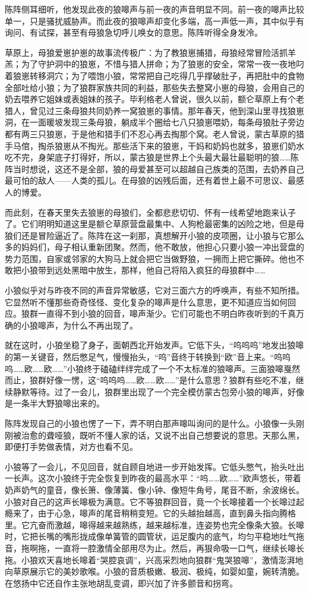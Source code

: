 \par 陈阵侧耳细听，他发现此夜的狼嗥声与前一夜的声音明显不同。前一夜的嗥声比较单一，只是骚扰威胁声。而此夜的狼嗥声却变化多端，高一声低一声，其中似乎有询问、有试探，甚至有母狼急切呼儿唤女的意思。陈阵听得全身发冷。
\par 草原上，母狼爱崽护崽的故事流传极广：为了教狼崽捕猎，母狼经常冒险活抓羊羔；为了守护洞中的狼崽，不惜与猎人拼命；为了狼崽的安全，常常一夜一夜地叼着狼崽转移洞穴；为了喂饱小狼，常常把自己吃得几乎撑破肚子，再把肚中的食物全部吐给小狼；为了狼群家族共同的利益，那些失去整窝小崽的母狼，会用自己的奶去喂养它姐妹或表姐妹的孩子。毕利格老人曾说，很久以前，额仑草原上有个老猎人，曾见过三条母狼共同奶养一窝狼崽的事情。那年春天，他到深山里寻找狼崽洞，在一面暖坡发现三条母狼，躺成半个圈给七八只狼崽喂奶，每条母狼肚子旁边都有两三只狼崽，于是他和猎手们不忍心再去掏那个窝。老人曾说，蒙古草原的猎手马倌，掏杀狼崽从不掏光。那些活下来的狼崽，干妈和奶妈也就多，狼崽们奶水吃不完，身架底子打得好，所以，蒙古狼是世界上个头最大最壮最聪明的狼……陈阵当时想说，这还不是全部，狼的母爱甚至可以超越自己族类的范围，去奶养自己最可怕的敌人——人类的孤儿。在母狼的凶残后面，还有着世上最不可思议、最感人的博爱。
\par 而此刻，在春天里失去狼崽的母狼们，全都悲悲切切、怀有一线希望地跑来认子了。它们明明知道这里是额仑草原营盘最集中、人狗枪最密集的凶险之地，但是母狼们还是冒险逼近了。陈阵在这一刹那，真想解开小狼的皮项圈，让小狼与它那么多的妈妈们，母子相认重新团聚。然而，他不敢放，他担心只要小狼一冲出营盘的势力范围，自家或邻家的大狗马上就会把它当做野狼，一拥而上把它撕碎。他也不敢把小狼带到远处黑暗中放生，那样，他自己将陷入疯狂的母狼群中……
\par 小狼似乎对与昨夜不同的声音异常敏感，它对三面六方的呼唤声，有些不知所措。它显然听不懂那些奇奇怪怪、变化复杂的嗥声是什么意思，更不知道应当如何回应。狼群一直得不到小狼的回音，嗥声渐少。它们可能也不明白昨夜听到的千真万确的小狼嗥声，为什么不再出现了。
\par 就在这时，小狼坐稳了身子，面朝西北开始发声。它低下头，“呜呜呜”地发出狼嗥的第一关键音，然后憋足气，慢慢抬头，“呜”音终于转换到“欧”音上来。“呜呜呜……欧……欧……”小狼终于磕磕绊绊完成了一个不太标准的狼嗥声。三面狼嗥戛然而止，狼群好像一愣，这“呜呜呜……欧……欧……”是什么意思？狼群有些吃不准，继续静默等待。过了一会儿，狼群里出现了一个完全模仿蒙古包旁小狼的嗥声，好像是一条半大野狼嗥出来的。
\par 陈阵发现自己的小狼也愣了一下，弄不明白那声嗥叫询问的是什么。小狼像一头刚刚被治愈的聋哑狼，既听不懂人家的话，又说不出自己想要说的意思。天那么黑，即便打手势做表情，对方也看不见。
\par 小狼等了一会儿，不见回音，就自顾自地进一步开始发挥。它低头憋气，抬头吐出一长声。这次小狼终于完全恢复到昨夜的最高水平：“呜……欧……”欧声悠长，带着奶声奶气的童音，像长箫、像薄簧、像小钟、像短牛角号，尾音不断，余波绵长。小狼对自己的这声长嗥极为满意。它不等狼群回音，竟一个长嗥接着一个长嗥过起瘾来了，由于心急，嗥声的尾音稍稍变短。它的头越抬越高，直到鼻头指向腾格里。它亢奋而激越，嗥得越来越熟练，越来越标准，连姿势也完全像条大狼。长嗥时，它把长嘴的嘴形拢成像单簧管的圆管状，运足腹内的底气，均匀平稳地吐气拖音，拖啊拖，一直将一腔激情全部用尽为止。然后，再狠命吸一口气，继续长嗥长拖。小狼欢天喜地长嗥着“哭腔哀调”，兴高采烈地向狼群“鬼哭狼嗥”，激情澎湃地向草原展示它的美妙歌喉。小狼的音质极嫩、极润、极纯，如婴如童，婉转清脆。在悠扬中它还自作主张地胡乱变调，即兴加了许多颤音和拐弯。
